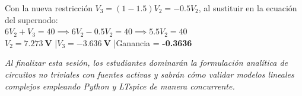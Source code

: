 \documentclass[11pt, a4paper]{article}
\begin{document}
\begin{tcolorbox}[caja_diagnostico, title=Solución de Autocontrol Docente]
Con la nueva restricción $V_3 = (1 - 1.5)V_2 = -0.5 V_2$, al sustituir en la ecuación del supernodo: \\
$6 V_2 + V_3 = 40 \implies 6 V_2 - 0.5 V_2 = 40 \implies 5.5 V_2 = 40$ \\
$V_2 = \mathbf{\qty{7.273}{\volt}}$ \quad|\quad $V_3 = \mathbf{\qty{-3.636}{\volt}}$ \quad|\quad Ganancia = \textbf{-0.3636}
\end{tcolorbox}

\vspace{0.3cm}
\textit{Al finalizar esta sesión, los estudiantes dominarán la formulación analítica de circuitos no triviales con fuentes activas y sabrán cómo validar modelos lineales complejos empleando Python y LTspice de manera concurrente.}
\end{document}
